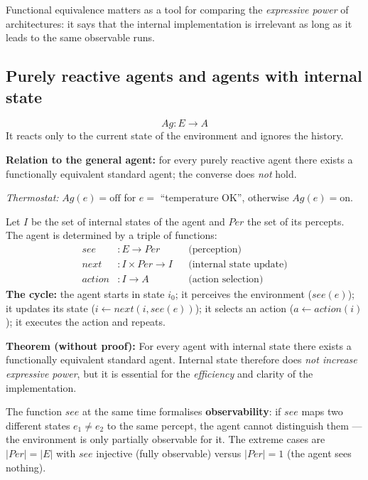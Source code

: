 \documentclass[11pt,a4paper]{article}
\theoremstyle{definition}
\providecommand{\uv}[1]{``#1''}
\begin{document}
Functional equivalence matters as a tool for comparing the \emph{expressive power} of
architectures: it says that the internal implementation is irrelevant as long as it leads to the
same observable runs.

\subsection{Purely reactive agents and agents with internal state}

\begin{defbox}
\[
Ag : E \to A
\]
It reacts only to the current state of the environment and ignores the history.

\textbf{Relation to the general agent:} for every purely reactive agent there exists a
functionally equivalent standard agent; the converse does \emph{not} hold.

\emph{Thermostat:} $Ag(e) = \mathrm{off}$ for $e = $ \uv{temperature OK}, otherwise
$Ag(e) = \mathrm{on}$.
\end{defbox}

\begin{defbox}
Let $I$ be the set of internal states of the agent and $\mathit{Per}$ the set of its percepts. The
agent is determined by a triple of functions:
\begin{align*}
\mathit{see} &: E \to \mathit{Per} && \text{(perception)}\\
\mathit{next} &: I \times \mathit{Per} \to I && \text{(internal state update)}\\
\mathit{action} &: I \to A && \text{(action selection)}
\end{align*}
\textbf{The cycle:} the agent starts in state $i_0$; it perceives the environment
($\mathit{see}(e)$); it updates its state ($i \leftarrow \mathit{next}(i, \mathit{see}(e))$); it
selects an action ($a \leftarrow \mathit{action}(i)$); it executes the action and repeats.

\textbf{Theorem (without proof):} For every agent with internal state there exists a functionally
equivalent standard agent. Internal state therefore does \emph{not increase expressive power}, but
it is essential for the \emph{efficiency} and clarity of the implementation.
\end{defbox}

The function $\mathit{see}$ at the same time formalises \textbf{observability}: if $\mathit{see}$
maps two different states $e_1 \ne e_2$ to the same percept, the agent cannot distinguish them ---
the environment is only partially observable for it. The extreme cases are
$|\mathit{Per}| = |E|$ with $\mathit{see}$ injective (fully observable) versus
$|\mathit{Per}| = 1$ (the agent sees nothing).
\end{document}

